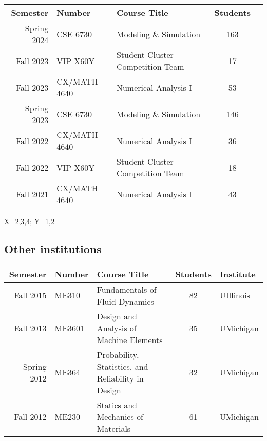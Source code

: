 \begin{center}
    \begin{longtable}{ r l l c c }
        \hline\hline
        \bf Semester&\bf Number     & \bf Course Title                  & \bf Students  \\ \hline
        Spring 2024 & CSE 6730       & Modeling \& Simulation            & 163 \\
        Fall 2023   & VIP X60Y       & Student Cluster Competition Team  & \phantom{1}17 \\
        Fall 2023   & CX/MATH 4640   & Numerical Analysis I              & \phantom{1}53 \\
        Spring 2023 & CSE 6730       & Modeling \& Simulation            & 146           \\
        Fall 2022   & CX/MATH 4640   & Numerical Analysis I              & \phantom{1}36 \\
        Fall 2022   & VIP X60Y       & Student Cluster Competition Team  & \phantom{1}18 \\
        Fall 2021   & CX/MATH 4640   & Numerical Analysis I              & \phantom{1}43 \\
        \hline\hline
    \end{longtable}
    \vspace{-1ex}
    X=2,3,4; Y=1,2
\end{center}

\subsection{Other institutions}

\begin{center}
    \begin{tabular}{ r l l c l }
        \hline\hline
        \bf Semester  &\bf Number & \bf Course Title & \bf Students & \bf Institute \\
        \hline
        Fall   2015 & ME310  & Fundamentals of Fluid Dynamics & 82 & UIllinois \\
        Fall   2013 & ME3601 & Design and Analysis of Machine Elements & 35 & UMichigan\\
        Spring 2012 & ME364  & Probability, Statistics, and Reliability in Design & 32 & UMichigan \\
        Fall   2012 & ME230  & Statics and Mechanics of Materials & 61 & UMichigan \\
        \hline\hline
    \end{tabular}
\end{center}

